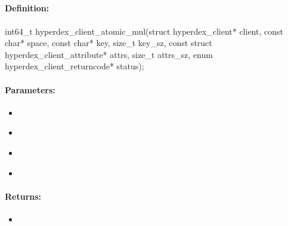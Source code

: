 \pagebreak
\subsection{}
\label{api:c:atomic_mul}


\paragraph{Definition:}
\begin{ccode}
int64_t hyperdex_client_atomic_mul(struct hyperdex_client* client,
        const char* space,
        const char* key, size_t key_sz,
        const struct hyperdex_client_attribute* attrs, size_t attrs_sz,
        enum hyperdex_client_returncode* status);
\end{ccode}

\paragraph{Parameters:}
\begin{itemize}[noitemsep]
\item {}\\

\item {}\\

\item {}\\

\item {}\\

\end{itemize}

\paragraph{Returns:}
\begin{itemize}[noitemsep]
\item {}\\

\end{itemize}


